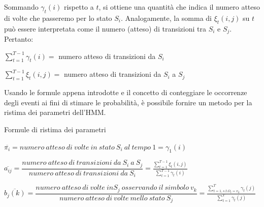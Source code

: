 \documentclass[mathserif]{beamer}
\begin{document}
\begin{frame}
 \begin{block}{}
  Sommando $\gamma_{t}(i)$ rispetto a $t$, si ottiene una quantit\`a che indica il numero atteso di volte che passeremo per lo stato $S_{i}$. Analogamente, la somma di $\xi_{t}(i,j)$ su $t$ pu\`o essere interpretata come il numero (atteso) di transizioni tra $S_{i}$ e $S_{j}$. Pertanto:
\begin{center}
 $\sum_{t=1}^{T-1}\gamma_{t}(i) =$ numero atteso di transizioni da $S_{i}$
\end{center}
\begin{center}
 $\sum_{t=1}^{T-1}\xi_{t}(i,j) =$ numero atteso di transizioni da $S_{i}$ a $S_{j}$
\end{center}
 \end{block}

\begin{block}{}
 Usando le formule appena introdotte e il concetto di conteggiare le occorrenze degli eventi ai fini di stimare le probabilit\`a, \`e possibile fornire un metodo per la ristima dei parametri dell'HMM.
\end{block}
\end{frame}

\begin{frame}
 \begin{block}{Formule di ristima dei parametri}
 \begin{center}
$\overline{\pi_{i}} = numero\ atteso\ di\ volte\ in\ stato\ S_{i}\ al\ tempo\ 1 = \gamma_{1}(i)$
\end{center}

\begin{center}
 $\overline{a_{ij}} = \dfrac{numero\ atteso\ di\ transizioni\ da\ S_{i}\ a\ S_{j}}{numero\ atteso\ di\ transizioni\ da\ S_{i}} = \frac{\sum_{t=1}^{T-1}\xi_{t}(i,j)}{\sum_{t=1}^{T-1}\gamma_{t}(i)}$
\end{center}

\begin{center}
 $ \overline{b_{j}(k)} = \dfrac{numero\ atteso\ di\ volte\ in S_{j}\ osservando\ il\ simbolo\ v_{k}}{numero\ atteso\ di\ volte\ mello\ stato\ S_{j}} = \frac{\sum_{t=1, s.t. O_{t} = v_{k}}^{T}\gamma_{t}(j)}{\sum_{t=1}^{T}\gamma_{t}(j)}$
\end{center}

 \end{block}

\end{frame}
\end{document}
